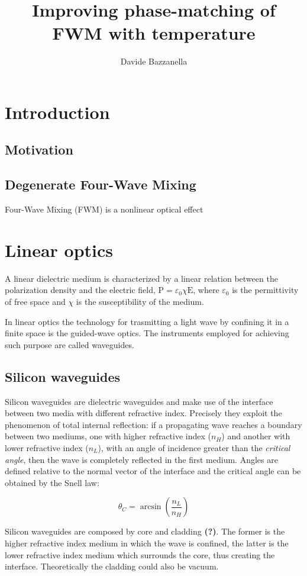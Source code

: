 \documentclass[12pt,a4paper]{article}
\author{Davide Bazzanella}
\title{Improving phase-matching of FWM with temperature}
\begin{document}

\newpage
\section{Introduction}
\subsection{Motivation}
\subsection{Degenerate Four-Wave Mixing}
Four-Wave Mixing (FWM) is a nonlinear optical effect

\section{Linear optics}

A linear dielectric medium is characterized by a linear relation between the polarization density and the electric field, $\mathrm{P} = \varepsilon_0 \chi \mathrm{E}$, where $\varepsilon_0$ is the permittivity of free space and $\chi$ is the susceptibility of the medium.

In linear optics the technology for trasmitting a light wave by confining it in a finite space is the guided-wave optics.
The instruments employed for achieving such purpose are called waveguides.
\subsection{Silicon waveguides}
Silicon waveguides are dielectric waveguides and make use of the interface between two media with different refractive index.
Precisely they exploit the phenomenon of total internal reflection: if a propagating wave reaches a boundary between two mediums, one with higher refractive index ($n_H$) and another with lower refractive index ($n_L$), with an angle of incidence greater than the \textit{critical angle}, then the wave is completely reflected in the first medium.
Angles are defined relative to the normal vector of the interface and the critical angle can be obtained by the Snell law:

$$	\theta_C = \arcsin \left( \frac{n_L}{n_H} \right)$$

Silicon waveguides are composed by core and cladding \textbf{(?)}. %
The former is the higher refractive index medium in which the wave is confined, the latter is the lower refractive index medium which surrounds the core, thus creating the interface. Theoretically the cladding could also be vacuum.
\end{document}
